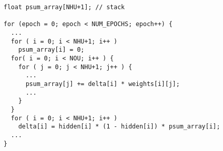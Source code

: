 \begin{lstlisting}[morekeywords={psum_array},belowskip=0pt]
float psum_array[NHU+1]; // stack

for (epoch = 0; epoch < NUM_EPOCHS; epoch++) {
  ...
  for ( i = 0; i < NHU+1; i++ )
    psum_array[i] = 0;
  for( i = 0; i < NOU; i++ ) {
    for ( j = 0; j < NHU+1; j++ ) {
      ...
      psum_array[j] += delta[i] * weights[i][j];
      ...
    }
  }
  for ( i = 0; i < NHU+1; i++ )
    delta[i] = hidden[i] * (1 - hidden[i]) * psum_array[i];
  ...
}
\end{lstlisting}
